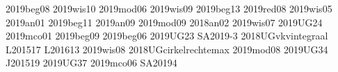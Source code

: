 2019beg08
2019wis10
2019mod06
2019wis09
2019beg13
2019red08
2019wis05
2019an01
2019beg11
2019an09
2019mod09
2018an02
2019wis07
2019UG24
2019mco01
2019beg09
2019beg06
2019UG23
SA2019-3
2018UGvkvintegraal
L201517
L201613
2019wis08
2018UGcirkelrechtemax
2019mod08
2019UG34
J201519
2019UG37
2019mco06
SA20194
